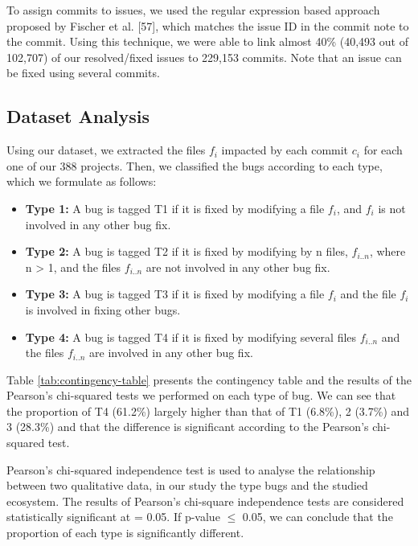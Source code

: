 \documentclass[12pt]{report}
\providecommand{\tightlist}{%
  \setlength{\itemsep}{0pt}\setlength{\parskip}{0pt}}
\begin{document}
To assign commits to issues, we used the regular expression based
approach proposed by Fischer et al. {[}57{]}, which matches the issue ID
in the commit note to the commit. Using this technique, we were able to
link almost 40\% (40,493 out of 102,707) of our resolved/fixed issues to
229,153 commits. Note that an issue can be fixed using several commits.

\subsection{\texorpdfstring{Dataset
Analysis\label{sec:dataset}}{Dataset Analysis}}\label{dataset-analysis}

Using our dataset, we extracted the files \(f_i\) impacted by each
commit \(c_i\) for each one of our 388 projects. Then, we classified the
bugs according to each type, which we formulate as follows:

\begin{itemize}
\tightlist
\item
  \textbf{Type 1:} A bug is tagged T1 if it is fixed by modifying a file
  \(f_i\), and \(f_i\) is not involved in any other bug fix.
\item
  \textbf{Type 2:} A bug is tagged T2 if it is fixed by modifying by n
  files, \(f_{i..n}\), where n \textgreater{} 1, and the files
  \(f_{i..n}\) are not involved in any other bug fix.
\item
  \textbf{Type 3:} A bug is tagged T3 if it is fixed by modifying a file
  \(f_{i}\) and the file \(f_{i}\) is involved in fixing other bugs.
\item
  \textbf{Type 4:} A bug is tagged T4 if it is fixed by modifying
  several files \(f_{i..n}\) and the files \(f_{i..n}\) are involved in
  any other bug fix.
\end{itemize}



Table \ref{tab:contingency-table} presents the contingency table and the
results of the Pearson's chi-squared tests we performed on each type of
bug. We can see that the proportion of T4 (61.2\%) largely higher than
that of T1 (6.8\%), 2 (3.7\%) and 3 (28.3\%) and that the difference is
significant according to the Pearson's chi-squared test.

Pearson's chi-squared independence test is used to analyse the
relationship between two qualitative data, in our study the type bugs
and the studied ecosystem. The results of Pearson's chi-square
independence tests are considered statistically significant at = 0.05.
If p-value \(\leq\) 0.05, we can conclude that the proportion of each
type is significantly different.
\end{document}
